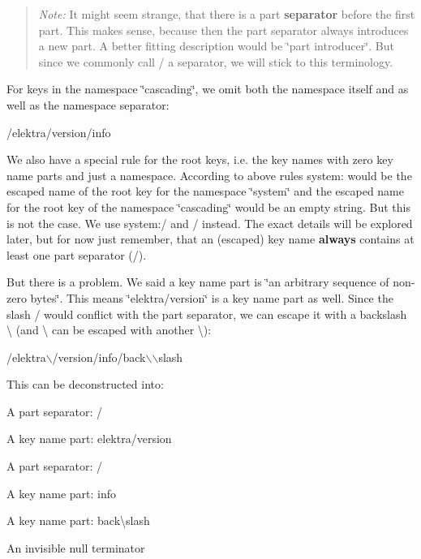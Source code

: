 \begin{quote}
{\itshape Note\+:} It might seem strange, that there is a part {\bfseries separator} before the first part. This makes sense, because then the part separator always introduces a new part. A better fitting description would be \char`\"{}part introducer\char`\"{}. But since we commonly call {\ttfamily /} a separator, we will stick to this terminology. \end{quote}


For keys in the namespace \char`\"{}cascading\char`\"{}, we omit both the namespace itself and as well as the namespace separator\+:


\begin{DoxyCode}
/elektra/version/info
\end{DoxyCode}


We also have a special rule for the root keys, i.\+e. the key names with zero key name parts and just a namespace. According to above rules {\ttfamily system\+:} would be the escaped name of the root key for the namespace \char`\"{}system\char`\"{} and the escaped name for the root key of the namespace \char`\"{}cascading\char`\"{} would be an empty string. But this is not the case. We use {\ttfamily system\+:/} and {\ttfamily /} instead. The exact details will be explored later, but for now just remember, that an (escaped) key name {\bfseries always} contains at least one part separator ({\ttfamily /}).

But there is a problem. We said a key name part is \char`\"{}an arbitrary sequence of non-\/zero bytes\char`\"{}. This means \char`\"{}elektra/version\char`\"{} is a key name part as well. Since the slash {\ttfamily /} would conflict with the part separator, we can escape it with a backslash {\ttfamily \textbackslash{}} (and {\ttfamily \textbackslash{}} can be escaped with another {\ttfamily \textbackslash{}})\+:


\begin{DoxyCode}
/elektra\(\backslash\)/version/info/back\(\backslash\)\(\backslash\)slash
\end{DoxyCode}


This can be deconstructed into\+:


\begin{DoxyItemize}
\item A part separator\+: {\ttfamily /}
\item A key name part\+: {\ttfamily elektra/version}
\item A part separator\+: {\ttfamily /}
\item A key name part\+: {\ttfamily info}
\item A key name part\+: {\ttfamily back\textbackslash{}slash}
\item An invisible null terminator
\end{DoxyItemize}

